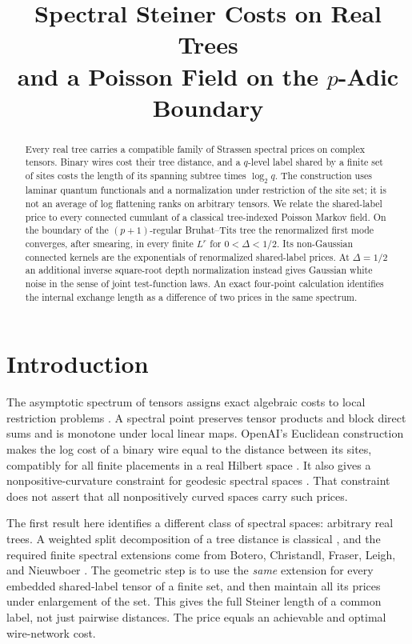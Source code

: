 \documentclass[11pt]{article}
\title{\bfseries Spectral Steiner Costs on Real Trees\\[2pt]
and a Poisson Field on the \texorpdfstring{\(p\)}{p}-Adic Boundary}
\author{}
\date{}
\theoremstyle{remark}
\begin{document}
\maketitle
\vspace{-1.25em}
\begin{abstract}
Every real tree carries a compatible family of Strassen spectral prices on complex tensors. Binary wires cost their tree distance, and a \(q\)-level label shared by a finite set of sites costs the length of its spanning subtree times \(\log_2 q\). The construction uses laminar quantum functionals and a normalization under restriction of the site set; it is not an average of log flattening ranks on arbitrary tensors. We relate the shared-label price to every connected cumulant of a classical tree-indexed Poisson Markov field. On the boundary of the \((p+1)\)-regular Bruhat--Tits tree the renormalized first mode converges, after smearing, in every finite \(L^r\) for \(0<\Delta<1/2\). Its non-Gaussian connected kernels are the exponentials of renormalized shared-label prices. At \(\Delta=1/2\) an additional inverse square-root depth normalization instead gives Gaussian white noise in the sense of joint test-function laws. An exact four-point calculation identifies the internal exchange length as a difference of two prices in the same spectrum.
\end{abstract}

\section{Introduction}

The asymptotic spectrum of tensors assigns exact algebraic costs to local restriction problems \cite{Strassen,CVZ}. A spectral point preserves tensor products and block direct sums and is monotone under local linear maps. OpenAI's Euclidean construction makes the log cost of a binary wire equal to the distance between its sites, compatibly for all finite placements in a real Hilbert space \cite[Theorem~1.1]{OpenAI}. It also gives a nonpositive-curvature constraint for geodesic spectral spaces \cite[Theorem~4.3]{OpenAI}. That constraint does not assert that all nonpositively curved spaces carry such prices.

The first result here identifies a different class of spectral spaces: arbitrary real trees. A weighted split decomposition of a tree distance is classical \cite{Buneman}, and the required finite spectral extensions come from Botero, Christandl, Fraser, Leigh, and Nieuwboer \cite{Botero}. The geometric step is to use the \emph{same} extension for every embedded shared-label tensor of a finite set, and then maintain all its prices under enlargement of the set. This gives the full Steiner length of a common label, not just pairwise distances. The price equals an achievable and optimal wire-network cost.
\end{document}
